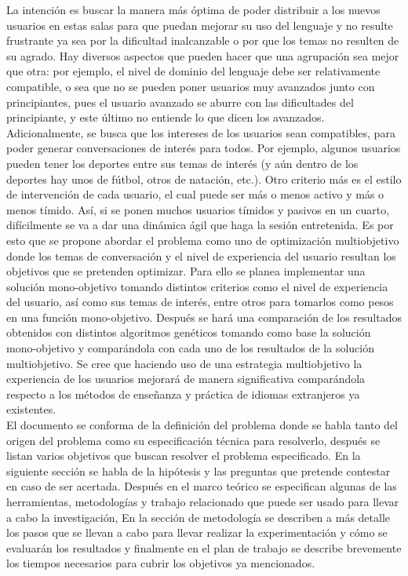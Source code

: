 La intención es buscar la manera más óptima de poder distribuir a los nuevos usuarios en estas salas para que puedan mejorar su uso del lenguaje y no resulte frustrante ya sea por la dificultad inalcanzable o por que los temas no resulten de su agrado. Hay diversos aspectos que pueden hacer que una agrupación sea mejor que otra: por ejemplo, el nivel de dominio del lenguaje debe ser relativamente compatible, o sea que no se pueden poner usuarios muy avanzados junto con principiantes, pues el usuario avanzado se aburre con las dificultades del principiante, y este último no entiende lo que dicen los avanzados. Adicionalmente, se busca que los intereses de los usuarios sean compatibles, para poder generar conversaciones de interés para todos. Por ejemplo, algunos usuarios pueden tener los deportes entre sus temas de interés (y aún dentro de los deportes hay unos de fútbol, otros de natación, etc.). Otro criterio más es el estilo de intervención de cada usuario, el cual puede ser más o menos activo y más o menos tímido. Así, si se ponen muchos usuarios tímidos y pasivos en un cuarto, difícilmente se va a dar una dinámica ágil que haga la sesión entretenida. Es por esto que se propone abordar el problema como uno de optimización multiobjetivo donde los temas de conversación y el nivel de experiencia del usuario resultan los objetivos que se pretenden optimizar. Para ello se planea implementar una solución mono-objetivo tomando distintos criterios como el nivel de experiencia del usuario, así como sus temas de interés, entre otros para tomarlos como pesos en una función mono-objetivo. Después se hará una comparación de los resultados obtenidos con distintos algoritmos genéticos tomando como base la solución mono-objetivo y comparándola con cada uno de los resultados de la solución multiobjetivo. Se cree que haciendo uso de una estrategia multiobjetivo la experiencia de los usuarios mejorará de manera significativa comparándola respecto a los métodos de enseñanza y práctica de idiomas extranjeros ya existentes.\\

El documento se conforma de la definición del problema donde se habla tanto del origen del problema como su especificación técnica para resolverlo, después se listan varios objetivos que buscan resolver el problema especificado. En la siguiente sección se habla de la hipótesis y las preguntas que pretende contestar en caso de ser acertada. Después en el marco teórico se especifican algunas de las herramientas, metodologías y trabajo relacionado que puede ser usado para llevar a cabo la investigación, En la sección de metodología se describen a más detalle los pasos que se llevan a cabo para llevar realizar la experimentación y cómo se evaluarán los resultados y finalmente en el plan de trabajo se describe brevemente los tiempos necesarios para cubrir los objetivos ya mencionados. 

